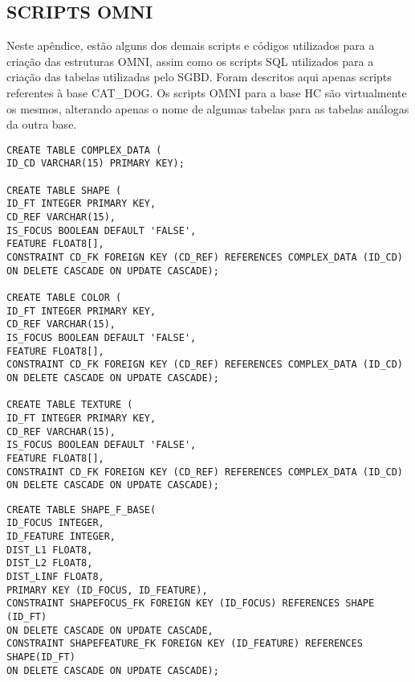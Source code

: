 
\begin{apendicesenv}
\partapendices

\chapter{SCRIPTS OMNI} %
\label{chap:apendice}

Neste apêndice, estão alguns dos demais scripts e códigos utilizados para a criação das estruturas OMNI, assim como 
os scripts SQL utilizados para a criação das tabelas utilizadas pelo SGBD. Foram descritos aqui apenas scripts
referentes à base CAT\_DOG. Os scripts OMNI para a base HC são virtualmente os mesmos, alterando apenas o nome
de algumas tabelas para as tabelas análogas da outra base.

\begin{lstlisting}[caption={Criação das tabelas primárias do banco}, captionpos=t,basicstyle=\tiny]
CREATE TABLE COMPLEX_DATA (
ID_CD VARCHAR(15) PRIMARY KEY);

CREATE TABLE SHAPE (
ID_FT INTEGER PRIMARY KEY,
CD_REF VARCHAR(15),
IS_FOCUS BOOLEAN DEFAULT 'FALSE',
FEATURE FLOAT8[],
CONSTRAINT CD_FK FOREIGN KEY (CD_REF) REFERENCES COMPLEX_DATA (ID_CD)
ON DELETE CASCADE ON UPDATE CASCADE); 

CREATE TABLE COLOR (
ID_FT INTEGER PRIMARY KEY,
CD_REF VARCHAR(15),
IS_FOCUS BOOLEAN DEFAULT 'FALSE',
FEATURE FLOAT8[],
CONSTRAINT CD_FK FOREIGN KEY (CD_REF) REFERENCES COMPLEX_DATA (ID_CD)
ON DELETE CASCADE ON UPDATE CASCADE); 

CREATE TABLE TEXTURE (
ID_FT INTEGER PRIMARY KEY,
CD_REF VARCHAR(15),
IS_FOCUS BOOLEAN DEFAULT 'FALSE',
FEATURE FLOAT8[],
CONSTRAINT CD_FK FOREIGN KEY (CD_REF) REFERENCES COMPLEX_DATA (ID_CD)
ON DELETE CASCADE ON UPDATE CASCADE); 
\end{lstlisting}

\begin{lstlisting}[caption={Criação das tabelas OMNI}, captionpos=t,basicstyle=\tiny]
CREATE TABLE SHAPE_F_BASE(
ID_FOCUS INTEGER,
ID_FEATURE INTEGER,
DIST_L1 FLOAT8,
DIST_L2 FLOAT8,
DIST_LINF FLOAT8,
PRIMARY KEY (ID_FOCUS, ID_FEATURE),
CONSTRAINT SHAPEFOCUS_FK FOREIGN KEY (ID_FOCUS) REFERENCES SHAPE (ID_FT)
ON DELETE CASCADE ON UPDATE CASCADE,
CONSTRAINT SHAPEFEATURE_FK FOREIGN KEY (ID_FEATURE) REFERENCES SHAPE(ID_FT)
ON DELETE CASCADE ON UPDATE CASCADE);


\end{lstlisting}
\end{apendicesenv}
